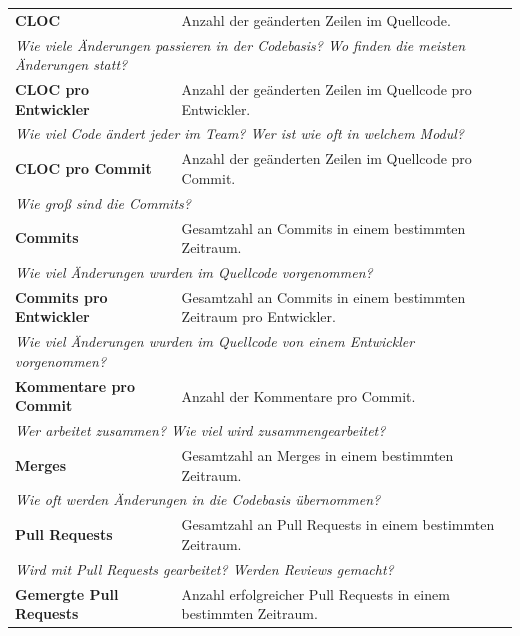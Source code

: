 \begin{table}[H]
  \centering
  \begin{tabular}{p{7cm}p{7.5cm}} \toprule
  \textbf{\ac{CLOC}} & Anzahl der geänderten Zeilen im Quellcode. \\
  \multicolumn{2}{p{14.5cm}}{\textit{Wie viele Änderungen passieren in der Codebasis? \newline Wo finden die meisten Änderungen statt?}} \\ \midrule
  \textbf{\ac{CLOC} pro Entwickler} & Anzahl der geänderten Zeilen im Quellcode pro Entwickler. \\ 
  \multicolumn{2}{p{14.5cm}}{\textit{Wie viel Code ändert jeder im Team? \newline  Wer ist wie oft in welchem Modul?}} \\ \midrule
  \textbf{\ac{CLOC} pro Commit} & Anzahl der geänderten Zeilen im Quellcode pro Commit. \\ 
  \multicolumn{2}{p{14.5cm}}{\textit{Wie groß sind die Commits?}} \\ \midrule
  \textbf{Commits} & Gesamtzahl an Commits in einem bestimmten Zeitraum. \\ 
  \multicolumn{2}{p{14.5cm}}{\textit{Wie viel Änderungen wurden im Quellcode vorgenommen?}} \\ \midrule
  \textbf{Commits pro Entwickler} & Gesamtzahl an Commits in einem bestimmten Zeitraum pro Entwickler. \\ 
  \multicolumn{2}{p{14.5cm}}{\textit{Wie viel Änderungen wurden im Quellcode von einem Entwickler vorgenommen?}} \\ \midrule
  \textbf{Kommentare pro Commit} & Anzahl der Kommentare pro Commit. \\ 
  \multicolumn{2}{p{14.5cm}}{\textit{Wer arbeitet zusammen? \newline Wie viel wird zusammengearbeitet?}} \\ \midrule
  \textbf{Merges} & Gesamtzahl an Merges in einem bestimmten Zeitraum. \\ 
  \multicolumn{2}{p{14.5cm}}{\textit{Wie oft werden Änderungen in die Codebasis übernommen?}} \\ \midrule
  \textbf{Pull Requests} & Gesamtzahl an Pull Requests in einem bestimmten Zeitraum. \\ 
  \multicolumn{2}{p{14.5cm}}{\textit{Wird mit Pull Requests gearbeitet? \newline Werden Reviews gemacht?}} \\ \midrule
  \textbf{Gemergte Pull Requests} & Anzahl erfolgreicher Pull Requests in einem bestimmten Zeitraum. \\ 

\end{tabular}
\end{table}
